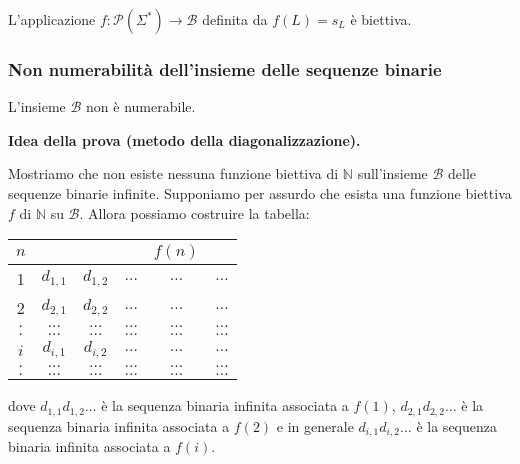 \vspace{5mm}

L'applicazione $f: \mathcal{P}\left(\Sigma^{*}\right) \rightarrow \mathcal{B}$ definita da $f(L)=s_{L}$ è biettiva.

\subsubsection{Non numerabilità dell'insieme delle sequenze binarie}

L'insieme $\mathcal{B}$ non è numerabile.

\vspace{5mm}

\textbf{Idea della prova (metodo della diagonalizzazione).}

Mostriamo che non esiste nessuna funzione biettiva di $\mathbb{N}$ sull'insieme $\mathcal{B}$ delle sequenze binarie infinite. Supponiamo per assurdo che esista una funzione biettiva $f$ di $\mathbb{N}$ su $\mathcal{B}$.
Allora possiamo costruire la tabella:

\vspace{5mm}

\begin{center}
\begin{tabular}{c|ccccc}
$n$ & & & & $f(n)$ & \\
\hline 1 & $d_{1,1}$ & $d_{1,2}$ & $\ldots$ & $\ldots$ & $\ldots$ \\
2 & $d_{2,1}$ & $d_{2,2}$ & $\ldots$ & $\ldots$ & $\ldots$ \\
$.$ & $\ldots$ & $\ldots$ & $\ldots$ & $\ldots$ & $\ldots$ \\
$.$ & $\ldots$ & $\ldots$ & $\ldots$ & $\ldots$ & $\ldots$ \\
$i$ & $d_{i, 1}$ & $d_{i, 2}$ & $\ldots$ & $\ldots$ & $\ldots$ \\
$.$ & $\ldots$ & $\ldots$ & $\ldots$ & $\ldots$ & $\ldots$ \\
$.$ & $\ldots$ & $\ldots$ & $\ldots$ & $\ldots$ & $\ldots$
\end{tabular}
\end{center}

\vspace{5mm}

dove $d_{1,1} d_{1,2} \ldots$ è la sequenza binaria infinita associata a $f(1)$, $d_{2,1} d_{2,2} \ldots$ è la sequenza binaria infinita associata a $f(2)$ e in generale $d_{i, 1} d_{i, 2} \ldots$ è la sequenza binaria infinita associata a $f(i)$.

\vspace{5mm}

